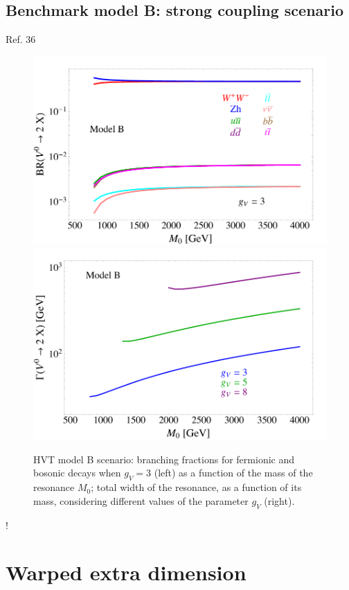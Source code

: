 \subsection{Benchmark model B: strong coupling scenario}
\label{sec:theory_HVT_B}
Ref. 36

\begin{figure}[!htb]
  \centering
    \includegraphics[width=.495\textwidth]{figures/Figures_BRSC.png}%
    \includegraphics[width=.495\textwidth]{figures/Figures_WidthSC.png}
  \caption{HVT model B scenario: branching fractions for fermionic and bosonic decays when $g_V = 3$ (left) as a function of the mass of the resonance $M_0$; total width of the resonance, as a function of its mass, considering different values of the parameter $g_V$ (right).}
  \label{fig:HVT_modelB_BR_width}
\end{figure}





{\color{red}
!\\
}



\newpage
\section{Warped extra dimension}
\label{sec:theory_WED}


\clearpage

